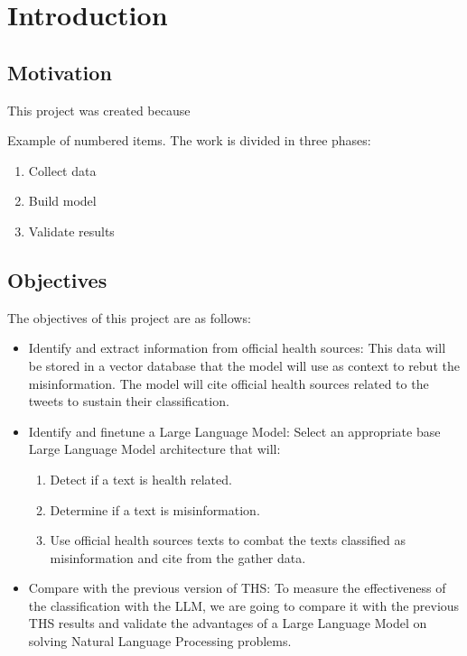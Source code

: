 

\chapter{Introduction}

\section{Motivation}

\noindent This project was created because

	
\noindent Example of numbered items. The work is divided in three phases: 

\begin{enumerate}
\item Collect data
\item Build model
\item Validate results
\end{enumerate} 

\section{Objectives}

\noindent
The objectives of this project are as follows:
\begin{itemize}
	\item Identify and extract information from official health sources: This data will be stored in a vector database that the model will use as context to rebut the misinformation. The model will cite official health sources related to the tweets to sustain their classification.
	\item Identify and finetune a Large Language Model: Select an appropriate base Large Language Model architecture that will:
	\begin{enumerate}
		\item Detect if a text is health related.
		\item Determine if a text is misinformation.
		\item Use official health sources texts to combat the texts classified as misinformation and cite from the gather data.
	\end{enumerate}
	\item Compare with the previous version of THS: To measure the effectiveness of the classification with the LLM, we are going to compare it with the previous THS results and validate the advantages of a Large Language Model on solving Natural Language Processing problems. 
\end{itemize}

